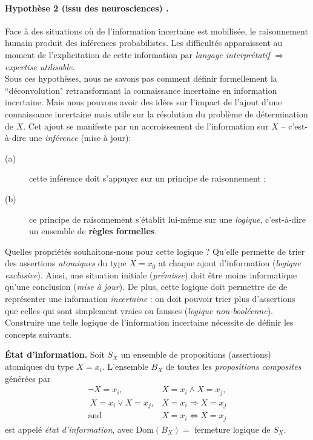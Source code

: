 \paragraph{Hypothèse 2 (issu des neurosciences)  \cite{Sanders2011,Salinas2011,Pouget2013,Gold2013,Dehaene2014,Chan2016}.}  Face à des situations où de l'information incertaine est mobilisée, le raisonnement humain produit des inférences probabilistes. Les difficultés apparaissent au moment de l'explicitation de cette information par  \emph{langage interprétatif} $\Rightarrow$ \emph{expertise utilisable}. \\

Sous ces hypothèses, nous ne savons pas comment définir formellement la  ``déconvolution" retransformant la connaissance incertaine en information incertaine. Mais nous pouvons avoir des idées sur l'impact de l'ajout d'une connaissance incertaine mais utile sur la résolution du problème de détermination de  $X$. Cet ajout se manifeste par un accroissement de l'information sur $X$ -- c'est-à-dire une \emph{inférence} (mise à jour): 
\begin{description}
\item[(a)] cette inférence doit s'appuyer sur un principe de raisonnement ;
\item[(b)] ce principe de raisonnement s'établit lui-même sur une  \emph{logique}, c'est-à-dire un ensemble de  {\bf règles formelles}. \\ 
\end{description}

Quelles propriétés souhaitons-nous pour cette logique ? Qu'elle permette de trier des assertions {\it atomiques} du type $X=x_0$ at chaque ajout d'information  ({\it logique exclusive}). Ainsi,  une situation initiale (\emph{prémisse}) doit être moins informatique qu'une conclusion (\emph{mise à jour}). De plus, cette logique doit permettre de de représenter une information {\it incertaine}  : on doit pouvoir trier plus d'assertions  que celles qui sont simplement vraies ou fausses  ({\it logique non-booléenne}). Construire une telle logique de l'information incertaine nécessite de définir les concepts suivants. \\

\begin{definition}{\bf \'Etat d'information.}
Soit $S_X$ un ensemble de propositions (assertions) atomiques du type $X=x_i$. L'ensemble $B_X$ de toutes les  {\it propositions composites} générées par 
\begin{eqnarray*}
\neg X=x_i, &  X=x_i \land X=x_j,  \\
 \ X=x_i \lor X=x_j, & X=x_i \Rightarrow X=x_j \\
 \text{and} & X=x_i \Leftrightarrow X=x_j
\end{eqnarray*} 
est appelé \emph{état d'information}, avec $\mbox{Dom}(B_X)=$ fermeture logique de $S_X$.
\end{definition}

